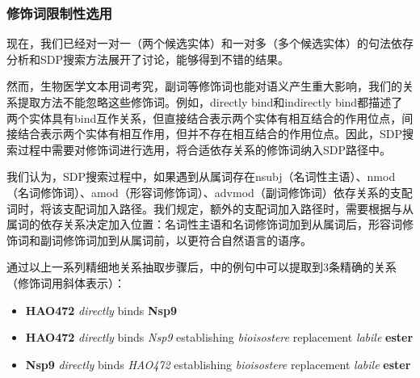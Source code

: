 \documentclass[twocolumn]{article}
\begin{document}
\subsubsection{修饰词限制性选用\label{chap:modifier}}
现在，我们已经对一对一（两个候选实体）和一对多（多个候选实体）的句法依存分析和SDP搜索方法展开了讨论，能够得到不错的结果。\par
然而，生物医学文本用词考究，副词等修饰词也能对语义产生重大影响，我们的关系提取方法不能忽略这些修饰词。例如，directly bind和indirectly bind都描述了两个实体具有bind互作关系，但直接结合表示两个实体有相互结合的作用位点，间接结合表示两个实体有相互作用，但并不存在相互结合的作用位点。因此，SDP搜索过程中需要对修饰词进行选用，将合适依存关系的修饰词纳入SDP路径中。\par
我们认为，SDP搜索过程中，如果遇到从属词存在nsubj（名词性主语）、nmod（名词修饰词）、amod（形容词修饰词）、advmod（副词修饰词）依存关系的支配词时，将该支配词加入路径。我们规定，额外的支配词加入路径时，需要根据与从属词的依存关系决定加入位置：名词性主语和名词修饰词加到从属词后，形容词修饰词和副词修饰词加到从属词前，以更符合自然语言的语序。\par
通过以上一系列精细地关系抽取步骤后，\cite{hao472}中的例句中可以提取到3条精确的关系（修饰词用斜体表示）：\par
\begin{itemize}
	\item \textbf{HAO472} \textit{directly} binds \textbf{Nsp9}
	\item \textbf{HAO472} \textit{directly} binds \textit{Nsp9} establishing \textit{bioisostere} replacement \textit{labile} \textbf{ester}
	\item \textbf{Nsp9} \textit{directly} binds \textit{HAO472} establishing \textit{bioisostere} replacement \textit{labile} \textbf{ester}
\end{itemize}\par
\end{document}
